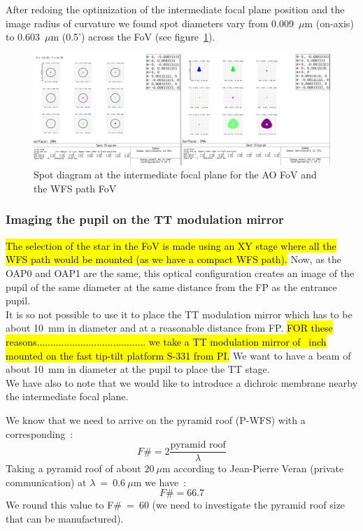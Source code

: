 \documentclass[12pt,a4paper]{article}
\begin{document}
After redoing the optimization of the intermediate focal plane position and the image radius of curvature we found spot diameters vary from 0.009~$\mu$m (on-axis) to 0.603~$\mu$m (0.5') across the FoV (see figure~\ref{fig:IntermediateFP_SpotDiagram}).\\
\begin{figure}[H]
	\begin{center}
		\includegraphics[width=.8\textwidth]{images/IntermediateFP_SpotDiagram.PNG}
		\caption{Spot diagram at the intermediate focal plane for the AO FoV and the WFS path FoV}\label{fig:IntermediateFP_SpotDiagram}
	\end{center}
\end{figure}

\subsubsection{Imaging the pupil on the TT modulation mirror}\label{subsubsec:TTMM}
\hl{The selection of the star in the FoV is made using an XY stage where all the WFS path would be mounted (as we have a compact WFS path).}
Now, as the OAP0 and OAP1 are the same, this optical configuration creates an image of the pupil of the same diameter at the same distance from the FP as the entrance pupil.\\ 
It is so not possible to use it to place the TT modulation mirror which has to be about 10~mm in diameter and at a reasonable distance from FP.
\hl{FOR these reasons........................................ we take a TT modulation mirror of ~inch mounted on the fast tip-tilt platform S-331 from PI.}
We want to have a beam of about 10~mm in diameter at the pupil to place the TT stage.\\

We have also to note that we would like to introduce a dichroic membrane nearby the intermediate focal plane.

We know that we need to arrive on the pyramid roof (P-WFS) with a corresponding~:
\begin{equation}
	 F\#=2\frac{\text{pyramid roof}}{\lambda}\label{eq:FnumEq}
\end{equation}
Taking a pyramid roof of about $20~\mu$m according to Jean-Pierre Veran (private communication) at $\lambda~=~0.6~\mu$m we have~:
\begin{equation}
	F\# = 66.7\label{eq:Fnum}
\end{equation}
We round this value to F\#~=~60 (we need to investigate the pyramid roof size that can be manufactured).\\
\end{document}
